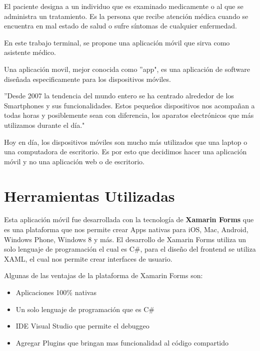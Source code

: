 El paciente designa a un individuo que es examinado medicamente o al que se administra un tratamiento\cite{Referencia9}. Es la persona que recibe atención médica cuando se encuentra en mal estado de salud o sufre síntomas de cualquier enfermedad.

En este trabajo terminal, se propone una aplicación móvil que sirva como asistente médico.

Una aplicación movil, mejor conocida como ''app", es una aplicación de software diseñada especificamente para los dispositivos móviles\cite{Referencia10}.

''Desde 2007 la tendencia del mundo entero se ha centrado alrededor de los Smartphones y sus funcionalidades. Estos pequeños dispositivos nos acompañan a todas horas y posiblemente sean con diferencia, los aparatos electrónicos que más utilizamos durante el día."\cite{Referencia11}

Hoy en día, los dispositivos móviles son mucho más utilizados que una laptop o una computadora de escritorio. Es por esto que decidimos hacer una aplicación móvil y no una aplicación web o de escritorio.

\section{Herramientas Utilizadas}


Esta aplicación móvil fue desarrollada con la tecnología de \textbf{Xamarin Forms} que es una plataforma que nos permite crear Apps nativas para iOS, Mac, Android, Windows Phone, Windows 8 y más. El desarrollo de Xamarin Forms utiliza un solo lenguaje de programación el cual es C\#, para el diseño del frontend se utiliza XAML, el cual nos permite crear interfaces de usuario. 

Algunas de las ventajas de la plataforma de Xamarin Forms son: 
\begin{itemize}
	\item Aplicaciones 100\% nativas
	\item Un solo lenguaje de programación que es C\#
	\item IDE Visual Studio que permite el debuggeo
	\item Agregar Plugins que bringan mas funcionalidad al código compartido
\end{itemize}

